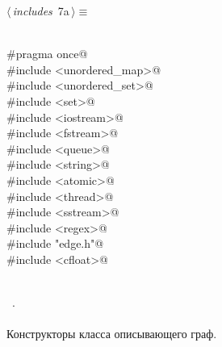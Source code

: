 \documentclass[12pt]{article}
\begin{document}
\begin{flushleft} \small
\begin{minipage}{\linewidth}\label{scrap7}\raggedright\small
{} $\langle\,${\itshape includes}\nobreak\ {\footnotesize {7a}}$\,\rangle\equiv$
\vspace{-1ex}
\begin{list}{}{} \item
\mbox{}\verb@@\\
\mbox{}\verb@#pragma once@\\
\mbox{}\verb@#include <unordered_map>@\\
\mbox{}\verb@#include <unordered_set>@\\
\mbox{}\verb@#include <set>@\\
\mbox{}\verb@#include <iostream>@\\
\mbox{}\verb@#include <fstream>@\\
\mbox{}\verb@#include <queue>@\\
\mbox{}\verb@#include <string>@\\
\mbox{}\verb@#include <atomic>@\\
\mbox{}\verb@#include <thread>@\\
\mbox{}\verb@#include <sstream>@\\
\mbox{}\verb@#include <regex>@\\
\mbox{}\verb@#include "edge.h"@\\
\mbox{}\verb@#include <cfloat>@\\
\mbox{}\verb@@\\
\mbox{}\verb@@{\NWsep}
\end{list}
\vspace{-1.5ex}
\footnotesize
\begin{list}{}{\setlength{\itemsep}{-\parsep}\setlength{\itemindent}{-\leftmargin}}
\item \NWtxtMacroRefIn\ .

\item{}
\end{list}
\end{minipage}\vspace{4ex}
\end{flushleft}
\paragraph{}
Конструкторы класса описывающего граф.
\end{document}
